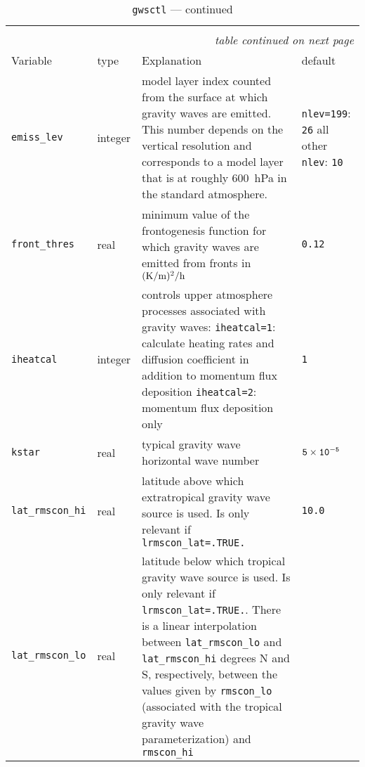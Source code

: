 \begin{longtable}{l@{\extracolsep\fill}lp{5.0cm}p{3.0cm}}
\hline\hline\caption[Namelist {\tt gwsctl}]{Namelist
  {\tt gwsctl}}\\\hline\label{tabgwsctl}
\endfirsthead
\caption[]{{\tt gwsctl} --- continued}\\\hline
\endhead
\hline\multicolumn{4}{r}{\slshape table continued on next page}\\
\endfoot
\hline %
\endlastfoot
Variable & type & Explanation & default \\\hline

{\tt emiss\_lev}\index{namelist variables!emiss\_lev}
 & integer & model layer index counted from the
  surface at which gravity waves are emitted. This number depends on
  the vertical resolution and corresponds to a model layer that is at
  roughly 600~hPa in the standard atmosphere. &
  {\tt nlev=199}: {\tt 26}\newline
  all other {\tt nlev}: {\tt 10}\\
{\tt front\_thres}\index{namelist variables!front\_thres}
 & real & minimum value of the frontogenesis
  function for which gravity waves are emitted from fronts in $\rm
  (K/m)^2/h$ & {\tt 0.12} \\
{\tt iheatcal}\index{namelist variables!iheatcal}
 & integer & controls upper atmosphere processes
  associated with gravity waves: \newline
  {\tt iheatcal=1}: calculate heating rates and diffusion coefficient
  in addition to momentum flux deposition\newline
  {\tt iheatcal=2}: momentum flux deposition only &
  {\tt 1}\\ 
{\tt kstar}\index{namelist variables!kstar} & real & typical gravity
wave horizontal wave 
  number & {$\tt 5\times10^{-5}$}\\
{\tt lat\_rmscon\_hi}\index{namelist variables!lat\_rmscon\_hi}
 & real & latitude above which extratropical
  gravity wave source is used. Is only relevant if {\tt
    lrmscon\_lat=.TRUE.} & {\tt 10.0} \\
{\tt lat\_rmscon\_lo}\index{namelist variables!lat\_rmscon\_lo}
 & real & latitude below which tropical
  gravity wave source is used. Is only relevant if {\tt
    lrmscon\_lat=.TRUE.}. There is a linear interpolation between
  {\tt lat\_rmscon\_lo} and {\tt lat\_rmscon\_hi} degrees N and S,
  respectively, between the values given by {\tt rmscon\_lo} (associated
  with the tropical gravity wave parameterization) and {\tt rmscon\_hi}

\end{longtable}
